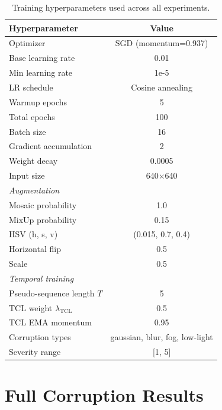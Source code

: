 \documentclass[review]{eccv2026}
\begin{document}
\begin{table}[h]
  \centering
  \caption{Training hyperparameters used across all experiments.}
  \label{tab:supp_hyper}
  \small
  \begin{tabular}{l|c}
    \toprule
    \textbf{Hyperparameter} & \textbf{Value} \\
    \midrule
    Optimizer & SGD (momentum=0.937) \\
    Base learning rate & 0.01 \\
    Min learning rate & 1e-5 \\
    LR schedule & Cosine annealing \\
    Warmup epochs & 5 \\
    Total epochs & 100 \\
    Batch size & 16 \\
    Gradient accumulation & 2 \\
    Weight decay & 0.0005 \\
    Input size & 640$\times$640 \\
    \midrule
    \multicolumn{2}{l}{\textit{Augmentation}} \\
    Mosaic probability & 1.0 \\
    MixUp probability & 0.15 \\
    HSV (h, s, v) & (0.015, 0.7, 0.4) \\
    Horizontal flip & 0.5 \\
    Scale & 0.5 \\
    \midrule
    \multicolumn{2}{l}{\textit{Temporal training}} \\
    Pseudo-sequence length $T$ & 5 \\
    TCL weight $\lambda_\text{TCL}$ & 0.5 \\
    TCL EMA momentum & 0.95 \\
    Corruption types & gaussian, blur, fog, low-light \\
    Severity range & [1, 5] \\
    \bottomrule
  \end{tabular}
\end{table}

\section{Full Corruption Results}
\label{sec:supp_corruption}
\end{document}
